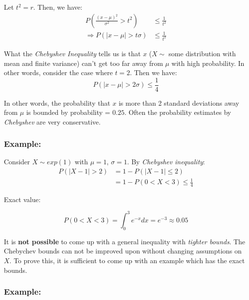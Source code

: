 \documentclass{article}
\begin{document}
    Let $t^2 = r$. Then, we have:
    \begin{equation*}
        \begin{split}
            P\left( \frac{(x-\mu)^2}{\sigma^2} > t^2 \right) &\leq \frac{1}{t^2}\\
            \Rightarrow P(|x-\mu| > t\sigma ) &\leq \frac{1}{t^2}
        \end{split}
    \end{equation*}
    
    What the \textit{Chebyshev Inequality} tells us is that $x$ ($X\sim$ some distribution with mean and finite variance) can't get too far away from $\mu$ with high probability. In other words, consider the case where $t = 2$. Then we have:
    \begin{equation*}
        P(|x-\mu| > 2\sigma) \leq \frac{1}{4}
    \end{equation*}
    
    In other words, the probability that $x$ is more than 2 standard deviations away from $\mu$ is bounded by probability = $0.25$. Often the probability estimates by \textit{Chebyshev} are very conservative.
    
    \subsubsection*{Example:}
    Consider $X \sim exp(1)$ with $\mu = 1$, $\sigma = 1$. By \textit{Chebyshev inequality}:
    \begin{equation*}
        \begin{split}
            P(|X-1| > 2) &= 1-P(|X-1|\leq 2)\\
            &= 1 - P(0 < X < 3) \leq \frac{1}{4}
        \end{split}
    \end{equation*}
    
    Exact value:
    
    \begin{equation*}
        P(0<X<3) = \int_0^3 e^{-x} dx = e^{-3} \approx 0.05
    \end{equation*}
    
    \noindent It is \textbf{not possible} to come up with a general inequality with \textit{tighter bounds}. The Chebychev bounds can not be improved upon without changing assumptions on $X$. To prove this, it is sufficient to come up with an example which has the exact bounds. 
    
    \newpage
    \subsubsection*{Example:}
\end{document}
